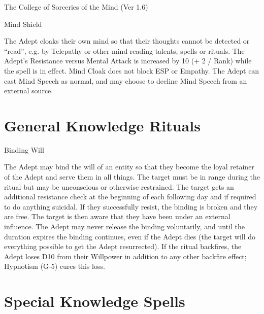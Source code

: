 \begin{Chapter}{The College of Sorceries of the Mind (Ver 1.6)}
\begin{spell}[G-7]{Mind Shield}

\begin{effects}
The Adept cloaks their own mind so that their thoughts cannot be
detected or “read”, e.g. by Telepathy or other mind reading talents,
spells or rituals.  The Adept’s Resistance versus Mental Attack is
increased by 10 (+ 2 / Rank) while the spell is in effect.  Mind Cloak
does not block ESP or Empathy.  The Adept can cast Mind Speech as
normal, and may choose to decline Mind Speech from an external source.
\end{effects}
\end{spell}

\section{General Knowledge Rituals}

\begin{ritual}[Q-1]{Binding Will}

\begin{effects}
The Adept may bind the will of an entity so that they become the loyal
retainer of the Adept and serve them in all things. The target must be
in range during the ritual but may be unconscious or otherwise
restrained.  The target gets an additional resistance check at the
beginning of each following day and if required to do anything
suicidal. If they successfully resist, the binding is broken and they
are free.  The target is then aware that they have been under an
external influence.  The Adept may never release the binding
voluntarily, and until the duration expires the binding continues,
even if the Adept dies (the target will do everything possible to get
the Adept resurrected). If the ritual backfires, the Adept loses D10
from their Willpower in addition to any other backfire effect;
Hypnotism (G-5) cures this loss.
\end{effects}
\end{ritual}

\section{Special Knowledge Spells}


\end{Chapter}
